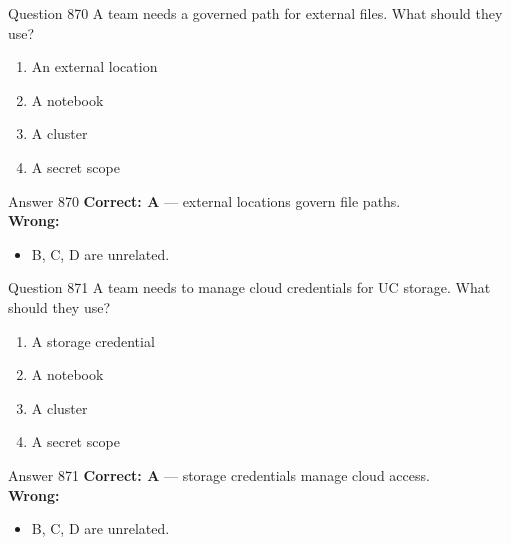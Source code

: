\documentclass[aspectratio=169,11pt]{beamer}
\begin{document}
	\begin{frame}{Question 870}
		A team needs a governed path for external files. What should they use?
		\begin{enumerate}[label=\Alph*.]
			\item An external location
			\item A notebook
			\item A cluster
			\item A secret scope
		\end{enumerate}
	\end{frame}
	\begin{frame}{Answer 870}
		\textbf{Correct: A} --- external locations govern file paths.\\
		\vspace{0.5em}
		\textbf{Wrong:}
		\begin{itemize}
			\item B, C, D are unrelated.
		\end{itemize}
	\end{frame}
	
	\begin{frame}{Question 871}
		A team needs to manage cloud credentials for UC storage. What should they use?
		\begin{enumerate}[label=\Alph*.]
			\item A storage credential
			\item A notebook
			\item A cluster
			\item A secret scope
		\end{enumerate}
	\end{frame}
	\begin{frame}{Answer 871}
		\textbf{Correct: A} --- storage credentials manage cloud access.\\
		\vspace{0.5em}
		\textbf{Wrong:}
		\begin{itemize}
			\item B, C, D are unrelated.
		\end{itemize}
	\end{frame}
	
\end{document}
